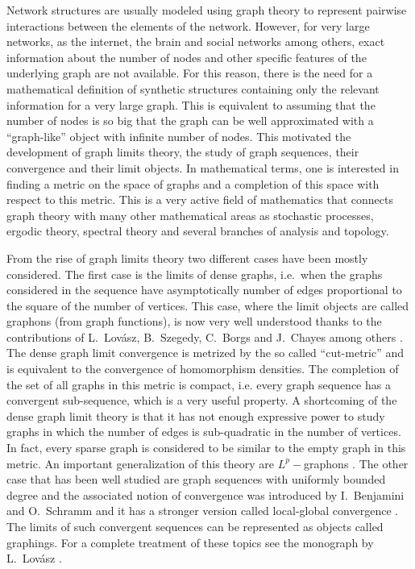 \documentclass[11pt]{article}
\begin{document}
Network structures are usually modeled using graph theory to represent pairwise interactions between the elements of the network. However, for very large networks, as the internet, the brain and social networks among others, exact information about the number of nodes and other specific features of the underlying graph are not available. For this reason, there is the need for a mathematical definition of synthetic structures containing only the relevant information for a very large graph. This is equivalent to assuming that the number of nodes is so big that the graph can be well approximated with a “graph-like” object with infinite number of nodes. This motivated the development of graph limits theory, the study of graph sequences, their convergence and their limit objects. In mathematical terms, one is interested in finding a metric on the space of graphs and a completion of this space with respect to this metric. This is a very active field of mathematics that connects graph theory with many other mathematical areas as stochastic processes, ergodic theory, spectral theory and several branches of analysis and topology.  

From the rise of graph limits theory two different cases have been mostly considered. The first case is the limits of dense graphs, i.e.\ when the graphs considered in the sequence have asymptotically number of edges proportional to the square of the number of vertices. This case, where the limit objects are called graphons (from graph functions), is now very well understood thanks to the contributions of L.\ Lovász, B.\ Szegedy, C.\ Borgs and J.\ Chayes among others  \cite{BORGS20081801,Lovsz2007SzemerdisLF, LOVASZ2006933}. The dense graph limit convergence is metrized by the so called “cut-metric” and is equivalent to the convergence of homomorphism densities. The completion of the set of all graphs in this metric is compact, i.e. every graph sequence has a convergent sub-sequence, which is a very useful property. A shortcoming of the dense graph limit theory is that it has not enough expressive power to study graphs in which the number of edges is sub-quadratic in the number of vertices. In fact, every sparse graph is considered to be similar to the empty graph in this metric. An important generalization of this theory are $L^p-$graphons \cite{LpGraphons1,Lpgraphon2}. The other case that has been well studied are graph sequences with uniformly bounded degree and the associated notion of convergence was introduced by I.\ Benjamini and O.\ Schramm \cite{BenjaminiLimit} and it has a stronger version called local-global convergence \cite{local-global1,Hatami2014LimitsOL}. The limits of such convergent sequences can be represented as objects called graphings. For a complete treatment of these topics see the monograph by L.\ Lovász \cite{LovaszGraphLimits}. 
\end{document}
